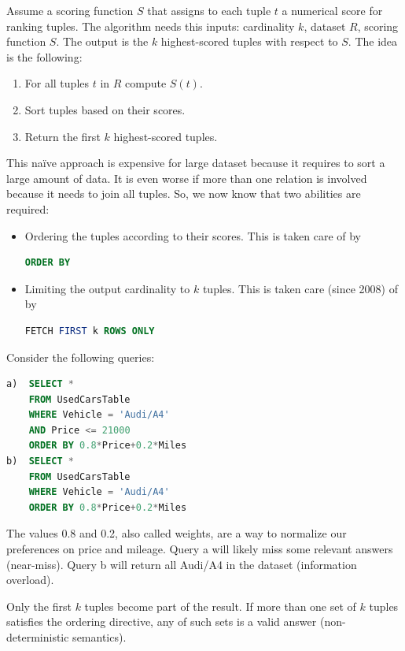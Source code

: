 \documentclass[12pt, a4paper]{report}
\newtheorem[style=M,bodystyle=\normalfont]{theorem}{Theorem}
\newtheorem[style=M,bodystyle=\normalfont]{corollary}{Corollary}
\newtheorem[style=M,bodystyle=\normalfont]{lemma}{Lemma}
\newtheorem[style=M,bodystyle=\normalfont]{definition}{Definition}
\begin{document}
    Assume a scoring function $S$ that assigns to each tuple $t$ a numerical score for ranking tuples. The algorithm needs this inputs: cardinality $k$, dataset $R$, scoring function $S$. The output is 
    the $k$ highest-scored tuples with respect to $S$. The idea is the following: 
    \begin{enumerate}
        \item For all tuples $t$ in $R$ compute $S(t)$. 
        \item Sort tuples based on their scores.
        \item Return the first $k$ highest-scored tuples. 
    \end{enumerate}
    This naïve approach is expensive for large dataset because it requires to sort a large amount of data. It is even worse if more than one relation is involved because it needs to join all tuples. So, 
    we now know that two abilities are required: 
    \begin{itemize}
        \item Ordering the tuples according to their scores. This is taken care of by 
            \begin{lstlisting}[language=SQL]
ORDER BY
            \end{lstlisting}
        \item Limiting the output cardinality to $k$ tuples. This is taken care (since 2008) of by 
            \begin{lstlisting}[language=SQL]
FETCH FIRST k ROWS ONLY
            \end{lstlisting}
    \end{itemize} 
    \begin{example}
        Consider the following queries: 
        \begin{lstlisting}[language=SQL]
a)  SELECT *
    FROM UsedCarsTable
    WHERE Vehicle = 'Audi/A4'
    AND Price <= 21000
    ORDER BY 0.8*Price+0.2*Miles
b)  SELECT *
    FROM UsedCarsTable
    WHERE Vehicle = 'Audi/A4'
    ORDER BY 0.8*Price+0.2*Miles
        \end{lstlisting}
        The values 0.8 and 0.2, also called weights, are a way to normalize our preferences on price and mileage.
        Query a will likely miss some relevant answers (near-miss). Query b will return all Audi/A4 in the dataset (information overload).
    \end{example}
    Only the first $k$ tuples become part of the result. If more than one set of $k$ tuples satisfies the ordering directive, any of such sets is a valid answer 
    (non-deterministic semantics). 
\end{document}
